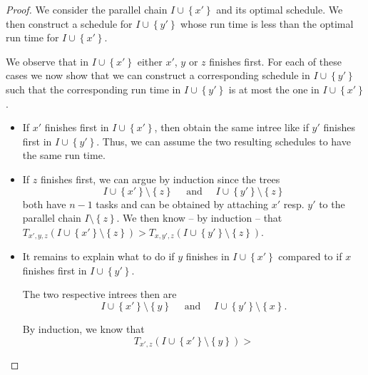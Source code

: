 \begin{proof}
  We consider the parallel chain $I\cup\left\{ x' \right\}$ and its optimal schedule. We then construct a schedule for $I\cup\left\{ y' \right\}$ whose run time is less than the optimal run time for $I\cup\left\{ x' \right\}$.
  
  We observe that in $I\cup\left\{ x' \right\}$ either $x'$, $y$ or $z$ finishes first. For each of these cases we now show that we can construct a corresponding schedule in $I\cup\left\{ y' \right\}$ such that the corresponding run time in $I\cup\left\{ y' \right\}$ is at most the one in $I\cup\left\{ x' \right\}$.

  \begin{itemize}
  \item If $x'$ finishes first in $I\cup\left\{ x' \right\}$, then obtain the same intree like if $y'$ finishes first in $I\cup\left\{ y' \right\}$. Thus, we can assume the two resulting schedules to have the same run time.
  \item If $z$ finishes first, we can argue by induction since the trees
    \begin{equation*}
      I\cup\left\{ x' \right\}\setminus\left\{ z \right\}
      \quad
      \text{ and }
      \quad 
      I\cup\left\{ y' \right\}\setminus\left\{ z \right\}
    \end{equation*}
    both have $n-1$ tasks and can be obtained by attaching $x'$ resp. $y'$ to the parallel chain $I\setminus\left\{ z \right\}$. We then know -- by induction -- that $T_{x',y,z}(I\cup\left\{ x' \right\}\setminus\left\{ z \right\}) > T_{x,y',z}(I\cup\left\{ y' \right\}\setminus\left\{ z \right\})$.
  \item It remains to explain what to do if $y$ finishes in $I\cup\left\{ x' \right\}$ compared to if $x$ finishes first in $I\cup\left\{ y' \right\}$.
    
    The two respective intrees then are
    \begin{equation*}
      I\cup\left\{ x' \right\}\setminus\left\{ y \right\} 
      \quad
      \text{ and }
      \quad
      I\cup\left\{ y' \right\}\setminus\left\{ x \right\}.
    \end{equation*}
    
    By induction, we know that
    \begin{equation*}
      T_{x', z}(I\cup\left\{ x' \right\}\setminus\left\{ y \right\})
      >
    \end{equation*}
  \end{itemize}
\end{proof}

